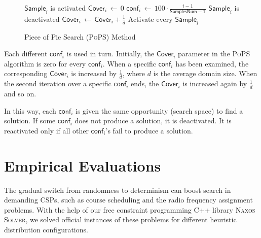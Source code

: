 \documentclass{ws-ijait}
\begin{document}
\begin{figure}
  \centering
  \begin{algorithmic}
        \State $\mathsf{Sample}_i$ is activated
        \State $\mathsf{Cover}_i \, \gets \, 0$
        \State $\mathsf{conf}_i \, \gets \,
                100 \cdot \frac{i - 1}{\mathsf{SamplesNum} - 1}$
      \EndFor
            \State $\mathsf{Sample}_i$ is deactivated
          \EndIf
          \State $\mathsf{Cover}_i \, \gets \,
                  \mathsf{Cover}_i + \frac{1}{d}$
        \EndFor
          \State Activate every $\mathsf{Sample}_i$
        \EndIf
      \EndWhile
    \EndFunction
  \end{algorithmic}
  \caption{Piece of Pie Search ({\normalfont\textsc{PoPS}})
           Method\label{PoPS-algorithm}}
\end{figure}

Each different $\mathsf{conf}_i$ is used in turn. Initially,
the $\mathsf{Cover}_i$ parameter in the \textsc{PoPS}
algorithm is zero for every $\mathsf{conf}_i$. When a
specific $\mathsf{conf}_i$ has been examined, the
corresponding $\mathsf{Cover}_i$ is increased by
$\frac{1}{d}$, where $d$ is the average domain size. When
the second iteration over a specific $\mathsf{conf}_i$ ends,
the $\mathsf{Cover}_i$ is increased again by $\frac{1}{d}$
and so on.

In this way, each $\mathsf{conf}_i$ is given the same
opportunity (search space) to find a solution. If some
$\mathsf{conf}_i$ does not produce a solution, it is
deactivated. It is reactivated only if all other
$\mathsf{conf}_i$'s fail to produce a solution.


\section{Empirical Evaluations\label{experiments}}

The gradual switch from randomness to determinism can boost
search in demanding CSPs, such as course scheduling and the
radio frequency assignment problems. With the help of our
free constraint programming C++ library \textsc{Naxos
Solver},\cite{Naxos} we solved official instances of these
problems for different heuristic distribution
configurations.
\end{document}

